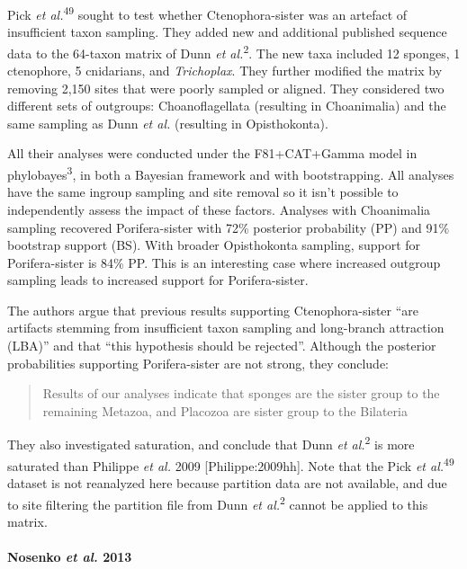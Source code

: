 \documentclass[]{article}
\let\oldparagraph\paragraph
\renewcommand{\paragraph}[1]{\oldparagraph{#1}\mbox{}}
\begin{document}
Pick \emph{et al.}\textsuperscript{49} sought to test whether
Ctenophora-sister was an artefact of insufficient taxon sampling. They
added new and additional published sequence data to the 64-taxon matrix
of Dunn \emph{et al.}\textsuperscript{2}. The new taxa included 12
sponges, 1 ctenophore, 5 cnidarians, and \emph{Trichoplax}. They further
modified the matrix by removing 2,150 sites that were poorly sampled or
aligned. They considered two different sets of outgroups:
Choanoflagellata (resulting in Choanimalia) and the same sampling as
Dunn \emph{et al.} (resulting in Opisthokonta).

All their analyses were conducted under the F81+CAT+Gamma model in
phylobayes\textsuperscript{3}, in both a Bayesian framework and with
bootstrapping. All analyses have the same ingroup sampling and site
removal so it isn't possible to independently assess the impact of these
factors. Analyses with Choanimalia sampling recovered Porifera-sister
with 72\% posterior probability (PP) and 91\% bootstrap support (BS).
With broader Opisthokonta sampling, support for Porifera-sister is 84\%
PP. This is an interesting case where increased outgroup sampling leads
to increased support for Porifera-sister.

The authors argue that previous results supporting Ctenophora-sister
``are artifacts stemming from insufficient taxon sampling and
long-branch attraction (LBA)'' and that ``this hypothesis should be
rejected''. Although the posterior probabilities supporting
Porifera-sister are not strong, they conclude:

\begin{quote}
Results of our analyses indicate that sponges are the sister group to
the remaining Metazoa, and Placozoa are sister group to the Bilateria
\end{quote}

They also investigated saturation, and conclude that Dunn \emph{et
al.}\textsuperscript{2} is more saturated than Philippe \emph{et al.}
2009 {[}Philippe:2009hh{]}. Note that the Pick \emph{et
al.}\textsuperscript{49} dataset is not reanalyzed here because
partition data are not available, and due to site filtering the
partition file from Dunn \emph{et al.}\textsuperscript{2} cannot be
applied to this matrix.

\hypertarget{nosenko-et-al.-2013}{%
\paragraph{\texorpdfstring{Nosenko \emph{et al.}
2013}{Nosenko et al. 2013}}\label{nosenko-et-al.-2013}}
\end{document}
